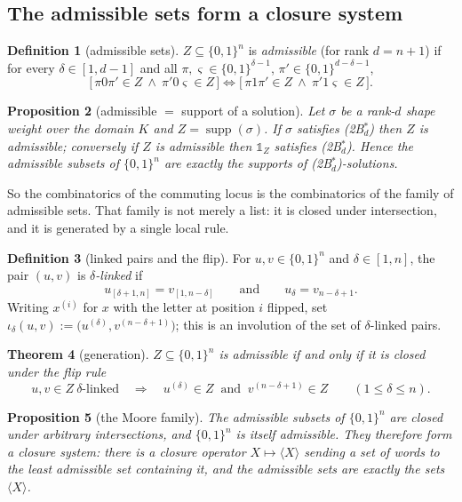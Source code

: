 \documentclass[11pt]{article}
\newtheorem{theorem}{Theorem}[section]
\newtheorem{proposition}[theorem]{Proposition}
\theoremstyle{definition}
\newtheorem{definition}[theorem]{Definition}
\theoremstyle{remark}
\newcommand{\cube}{\{0,1\}}
\newcommand{\one}{\mathbb{1}}
\newcommand{\supp}{\operatorname{supp}}
\begin{document}
\subsection{The admissible sets form a closure system}\label{sec:res-order}

\begin{definition}[admissible sets]\label{def:adm}
$Z\subseteq\cube^{n}$ is \emph{admissible} (for rank $d=n+1$) if for every $\delta\in[1,d-1]$
and all $\pi,\varsigma\in\cube^{\delta-1}$, $\pi'\in\cube^{d-\delta-1}$,
\[
  \bigl[\,\pi0\pi'\in Z\ \wedge\ \pi'0\varsigma\in Z\,\bigr]
  \iff
  \bigl[\,\pi1\pi'\in Z\ \wedge\ \pi'1\varsigma\in Z\,\bigr].
\]
\end{definition}

\begin{proposition}[admissible $=$ support of a solution]\label{prop:supp}
Let $\sigma$ be a rank-$d$ shape weight over the domain $K$ and $Z=\supp(\sigma)$.  If
$\sigma$ satisfies \textnormal{(2B$^{*}_d$)} then $Z$ is admissible; conversely if $Z$ is
admissible then $\one_Z$ satisfies \textnormal{(2B$^{*}_d$)}.  Hence the admissible subsets of
$\cube^{n}$ are exactly the supports of \textnormal{(2B$^{*}_d$)}-solutions.
\end{proposition}

So the combinatorics of the commuting locus is the combinatorics of the family of admissible
sets.  That family is not merely a list: it is closed under intersection, and it is generated
by a single local rule.

\begin{definition}[linked pairs and the flip]\label{def:linked}
For $u,v\in\cube^{n}$ and $\delta\in[1,n]$, the pair $(u,v)$ is \emph{$\delta$-linked} if
\[
   u_{[\delta+1,n]}=v_{[1,n-\delta]}\qquad\text{and}\qquad u_\delta=v_{n-\delta+1}.
\]
Writing $x^{(i)}$ for $x$ with the letter at position $i$ flipped, set
$\iota_\delta(u,v):=\bigl(u^{(\delta)},v^{(n-\delta+1)}\bigr)$; this is an involution of the
set of $\delta$-linked pairs.
\end{definition}

\begin{theorem}[generation]\label{thm:closure}
$Z\subseteq\cube^{n}$ is admissible if and only if it is closed under the flip rule
\[
   u,v\in Z\ \text{$\delta$-linked}\quad\Longrightarrow\quad
   u^{(\delta)}\in Z\ \text{ and }\ v^{(n-\delta+1)}\in Z
   \qquad(1\le\delta\le n). \tag{R}
\]
\end{theorem}

\begin{proposition}[the Moore family]\label{prop:moore}
The admissible subsets of $\cube^{n}$ are closed under arbitrary intersections, and
$\cube^{n}$ is itself admissible.  They therefore form a closure system: there is a closure
operator $X\mapsto\langle X\rangle$ sending a set of words to the least admissible set
containing it, and the admissible sets are exactly the sets $\langle X\rangle$.
\end{proposition}
\end{document}
